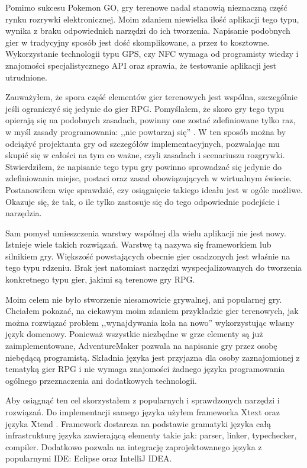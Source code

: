 \documentclass[openright]{xmgr}
\begin{document}
Pomimo sukcesu Pokemon GO, gry terenowe nadal stanowią nieznaczną część rynku rozrywki elektronicznej. Moim zdaniem niewielka ilość aplikacji tego typu, wynika z braku odpowiednich narzędzi do ich tworzenia. Napisanie podobnych gier w tradycyjny sposób jest dość skomplikowane, a przez to kosztowne. Wykorzystanie technologii typu GPS, czy NFC wymaga od programisty wiedzy i znajomości specjalistycznego API oraz sprawia, że testowanie aplikacji jest utrudnione.

Zauważyłem, że spora część elementów gier terenowych jest wspólna, szczególnie jeśli ograniczyć się jedynie do gier RPG. Pomyślałem, że skoro gry tego typu opierają się na podobnych zasadach, powinny one zostać zdefiniowane tylko raz, w myśl zasady programowania: ,,nie powtarzaj się'' \cite{CleanCode:2005}. W ten sposób można by odciążyć projektanta gry od szczegółów implementacyjnych, pozwalając mu skupić się w całości na tym co ważne, czyli zasadach i scenariuszu rozgrywki. Stwierdziłem, że napisanie tego typu gry powinno sprowadzać się jedynie do zdefiniowania miejsc, postaci oraz zasad obowiązujących w wirtualnym świecie. Postanowiłem więc sprawdzić, czy osiągnięcie takiego ideału jest w ogóle możliwe. Okazuje się, że tak, o ile tylko zastosuje się do tego odpowiednie podejście i narzędzia.

Sam pomysł umieszczenia warstwy wspólnej dla wielu aplikacji nie jest nowy. Istnieje wiele takich rozwiązań. Warstwę tą nazywa się frameworkiem lub silnikiem gry. Większość powstających obecnie gier osadzonych jest właśnie na tego typu rdzeniu. Brak jest natomiast narzędzi wyspecjalizowanych do tworzenia konkretnego typu gier, jakimi są terenowe gry RPG.

Moim celem nie było stworzenie niesamowicie grywalnej, ani popularnej gry. Chciałem pokazać, na ciekawym moim zdaniem przykładzie gier terenowych, jak można rozwiązać problem ,,wynajdywania koła na nowo'' wykorzystując własny język domenowy. Ponieważ wszystkie niezbędne w grze elementy są już zaimplementowane, AdventureMaker pozwala na napisanie gry przez osobę niebędącą programistą. Składnia języka jest przyjazna dla osoby zaznajomionej z tematyką gier RPG i nie wymaga znajomości żadnego języka programowania ogólnego przeznaczenia ani dodatkowych technologii.

Aby osiągnąć ten cel skorzystałem z popularnych i sprawdzonych narzędzi i rozwiązań. Do implementacji samego języka użyłem frameworka Xtext oraz języka Xtend \cite{Xtend:2017:Doc}. Framework dostarcza na podstawie gramatyki języka całą infrastrukturę języka zawierającą elementy takie jak: parser, linker, typechecker, compiler. Dodatkowo pozwala na integrację zaprojektowanego języka z popularnymi IDE: Eclipse oraz IntelliJ IDEA. 
\end{document}
